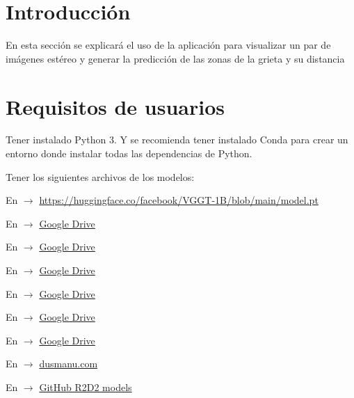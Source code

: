 
\section{Introducción}
En esta sección se explicará el uso de la aplicación para visualizar un par de imágenes estéreo y generar la predicción de las zonas de la grieta y su distancia

\section{Requisitos de usuarios}
Tener instalado Python 3. Y se recomienda tener instalado Conda para crear un entorno donde instalar todas las dependencias de Python.

Tener los siguientes archivos de los modelos:

En  $\rightarrow$
\url{https://huggingface.co/facebook/VGGT-1B/blob/main/model.pt}

En  $\rightarrow$
\href{https://drive.google.com/drive/folders/1cZLcIjHlmUo986gkR6FbofG1cj5BT36x}{Google Drive}

En  $\rightarrow$
\href{https://drive.google.com/drive/folders/1cZLcIjHlmUo986gkR6FbofG1cj5BT36x}{Google Drive}

En  $\rightarrow$
\href{https://drive.google.com/drive/folders/1cZLcIjHlmUo986gkR6FbofG1cj5BT36x}{Google Drive}

En  $\rightarrow$
\href{https://drive.google.com/drive/folders/1cZLcIjHlmUo986gkR6FbofG1cj5BT36x}{Google Drive}

En  $\rightarrow$
\href{https://drive.google.com/drive/folders/1cZLcIjHlmUo986gkR6FbofG1cj5BT36x}{Google Drive}

En  $\rightarrow$
\href{https://drive.google.com/drive/folders/1cZLcIjHlmUo986gkR6FbofG1cj5BT36x}{Google Drive}

En  $\rightarrow$
\href{https://dusmanu.com/files/d2-net/d2_tf.pth}{dusmanu.com}

En  $\rightarrow$
\href{https://github.com/naver/r2d2/tree/master/models}{GitHub R2D2 models}


